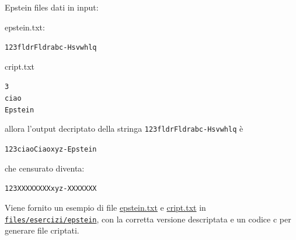 \begin{esercizioL}{Epstein files}
	 dati in input:
	\vskip3mm
	\begin{minipage}[t]{0.48\textwidth}
		epstein.txt:
		\begin{tcolorbox}
			\verb|123fldrFldrabc-Hsvwhlq|
		\end{tcolorbox}
	\end{minipage}
	\begin{minipage}[t]{0.48\textwidth}
		cript.txt
		\begin{tcolorbox}
			\verb|3|\\
			\verb|ciao|\\
			\verb|Epstein|
		\end{tcolorbox}
	\end{minipage}
	\vskip3mm
	allora l'output decriptato della stringa \verb|123fldrFldrabc-Hsvwhlq| è
	\begin{center}
		\verb|123ciaoCiaoxyz-Epstein|
	\end{center}
	che censurato diventa:
	\begin{center}
		\verb|123XXXXXXXXxyz-XXXXXXX|
	\end{center}
	Viene fornito un esempio di file \href{run:./files/esercizi/epstein/epstein.txt}{epstein.txt} e \href{run:./files/esercizi/epstein/cript.txt}{cript.txt} in \texttt{\href{run:./files/esercizi/epstein/}{files/esercizi/epstein}}, con la corretta versione descriptata e un codice c per generare file criptati.
\end{esercizioL}

